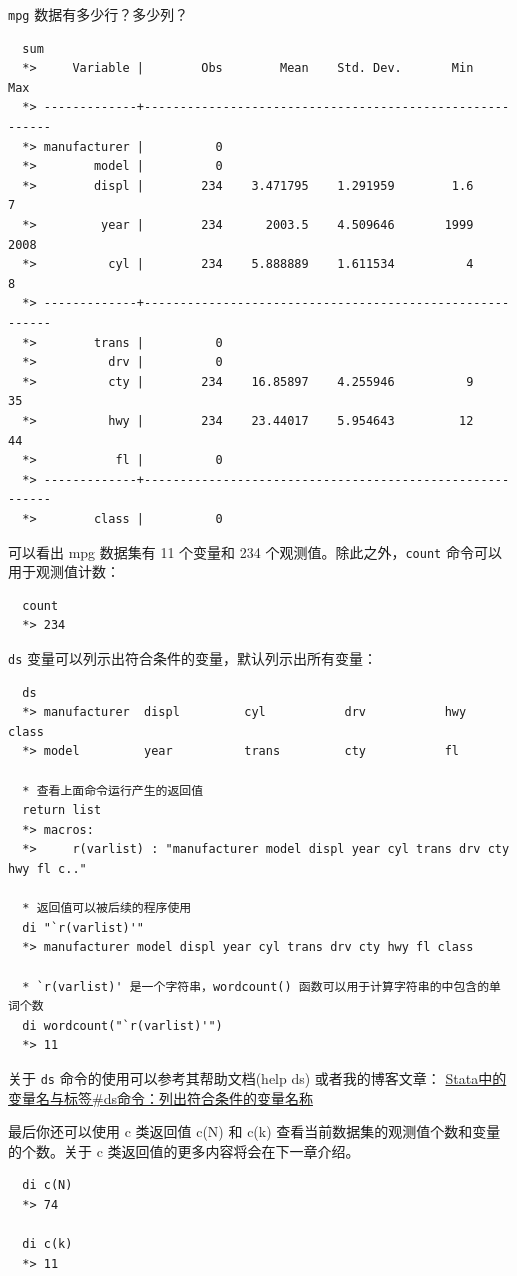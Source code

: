 \begin{exercise}
  \texttt{mpg} 数据有多少行？多少列？
\end{exercise}

\begin{solution}
  \begin{lstlisting}
  sum
  *>     Variable |        Obs        Mean    Std. Dev.       Min        Max
  *> -------------+---------------------------------------------------------
  *> manufacturer |          0
  *>        model |          0
  *>        displ |        234    3.471795    1.291959        1.6          7
  *>         year |        234      2003.5    4.509646       1999       2008
  *>          cyl |        234    5.888889    1.611534          4          8
  *> -------------+---------------------------------------------------------
  *>        trans |          0
  *>          drv |          0
  *>          cty |        234    16.85897    4.255946          9         35
  *>          hwy |        234    23.44017    5.954643         12         44
  *>           fl |          0
  *> -------------+---------------------------------------------------------
  *>        class |          0
  \end{lstlisting}

  可以看出 mpg 数据集有 11 个变量和 234 个观测值。除此之外，\texttt{count} 命令可以用于观测值计数：

  \begin{lstlisting}
  count
  *> 234
  \end{lstlisting}

  \texttt{ds} 变量可以列示出符合条件的变量，默认列示出所有变量：

  \begin{lstlisting}
  ds
  *> manufacturer  displ         cyl           drv           hwy           class
  *> model         year          trans         cty           fl

  * 查看上面命令运行产生的返回值
  return list
  *> macros:
  *>     r(varlist) : "manufacturer model displ year cyl trans drv cty hwy fl c.."

  * 返回值可以被后续的程序使用
  di "`r(varlist)'"
  *> manufacturer model displ year cyl trans drv cty hwy fl class

  * `r(varlist)' 是一个字符串，wordcount() 函数可以用于计算字符串的中包含的单词个数
  di wordcount("`r(varlist)'")
  *> 11
  \end{lstlisting}

  关于 \texttt{ds} 命令的使用可以参考其帮助文档(help ds) 或者我的博客文章： \href{https://www.czxa.top/posts/44612/\#ds\%E5\%91\%BD\%E4\%BB\%A4\%EF\%BC\%9A\%E5\%88\%97\%E5\%87\%BA\%E7\%AC\%A6\%E5\%90\%88\%E6\%9D\%A1\%E4\%BB\%B6\%E7\%9A\%84\%E5\%8F\%98\%E9\%87\%8F\%E5\%90\%8D\%E7\%A7\%B0}{Stata中的变量名与标签\#ds命令：列出符合条件的变量名称}

  最后你还可以使用 c 类返回值 c(N) 和 c(k) 查看当前数据集的观测值个数和变量的个数。关于 c 类返回值的更多内容将会在下一章介绍。

  \begin{lstlisting}
  di c(N)
  *> 74

  di c(k)
  *> 11
  \end{lstlisting}
\end{solution}

